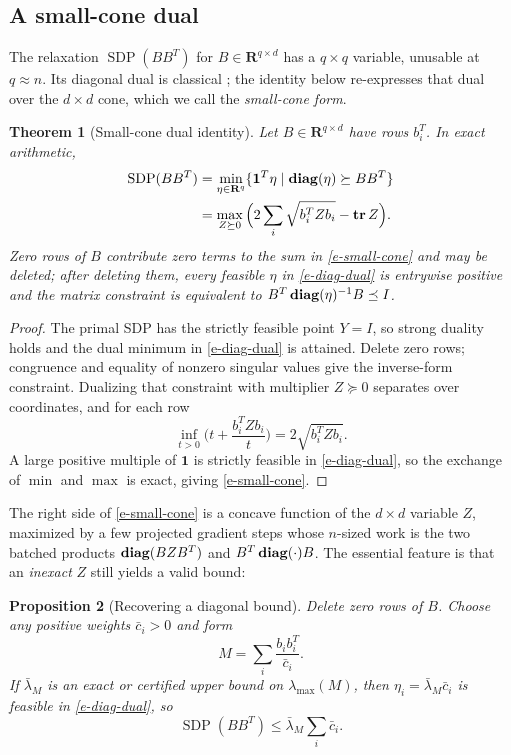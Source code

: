 \documentclass[12pt]{article}
\theoremstyle{plain}
\newtheorem{theorem}{Theorem}
\newtheorem{proposition}[theorem]{Proposition}
\theoremstyle{definition}
\newcommand{\reals}{\mathbf{R}}
\newcommand{\ones}{\mathbf{1}}
\newcommand{\diag}{\mathop{\bf diag}}
\newcommand{\Tr}{\mathop{\bf tr}}
\begin{document}
\subsection{A small-cone dual}\label{s-small-cone}

The relaxation $\operatorname{SDP}(BB^T)$ for $B\in\reals^{q\times d}$ has a
$q\times q$ variable, unusable at $q\approx n$. Its diagonal dual is
classical \citep{delorme1993laplacian}; the identity below re-expresses that
dual over the $d\times d$ cone, which we call the \emph{small-cone form}.

\begin{theorem}[Small-cone dual identity]\label{t-small-cone}
Let $B\in\reals^{q\times d}$ have rows $b_i^T$. In exact arithmetic,
\begin{align}
 \operatorname{SDP}(BB^T)
 &=\min_{\eta\in\reals^q}
   \{\ones^T\eta \mid \diag(\eta)\succeq BB^T\}
 \label{e-diag-dual}\\
 &=\max_{Z\succeq0}
   \Big(2\sum_i\sqrt{b_i^TZb_i}-\Tr Z\Big).
 \label{e-small-cone}
\end{align}
Zero rows of $B$ contribute zero terms to the sum in \eqref{e-small-cone} and
may be deleted; after deleting them, every feasible $\eta$ in
\eqref{e-diag-dual} is entrywise positive and the matrix constraint is
equivalent to $B^T\diag(\eta)^{-1}B\preceq I$.
\end{theorem}

\begin{proof}
The primal SDP has the strictly feasible point $Y=I$, so strong duality holds
and the dual minimum in \eqref{e-diag-dual} is attained. Delete zero rows;
congruence and equality of nonzero singular values give the inverse-form
constraint. Dualizing that constraint with multiplier $Z\succeq0$ separates
over coordinates, and for each row
\[
  \inf_{t>0}\Big(t+\frac{b_i^TZb_i}{t}\Big)=2\sqrt{b_i^TZb_i}.
\]
A large positive multiple of $\ones$ is strictly feasible in
\eqref{e-diag-dual}, so the exchange of $\min$ and $\max$ is exact, giving
\eqref{e-small-cone}.
\end{proof}

The right side of \eqref{e-small-cone} is a concave function of the $d\times
d$ variable $Z$, maximized by a few projected gradient steps whose $n$-sized
work is the two batched products $\diag(BZB^T)$ and $B^T\diag(\cdot)B$. The
essential feature is that an \emph{inexact} $Z$ still yields a valid bound:

\begin{proposition}[Recovering a diagonal bound]\label{p-recovery}
Delete zero rows of $B$. Choose any positive weights $\bar c_i>0$ and form
\[
  M=\sum_i\frac{b_ib_i^T}{\bar c_i}.
\]
If $\bar\lambda_M$ is an exact or certified upper bound on
$\lambda_{\max}(M)$, then $\eta_i=\bar\lambda_M\bar c_i$ is feasible in
\eqref{e-diag-dual}, so
\begin{equation}\label{e-recovered}
  \operatorname{SDP}(BB^T)\le\bar\lambda_M\sum_i\bar c_i .
\end{equation}
\end{proposition}
\end{document}
